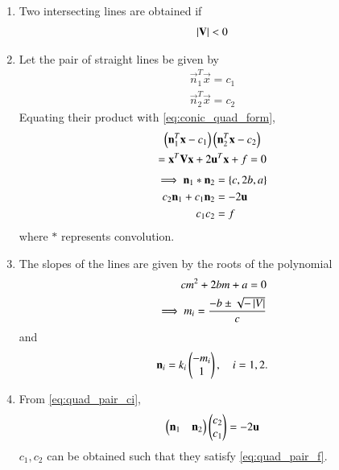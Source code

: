 \renewcommand{\theequation}{\theenumi}
\begin{enumerate}[label=\thesection.\arabic*.,ref=\thesection.\theenumi]

\item Two intersecting lines are obtained if 
\begin{align}
\label{eq:quad_pair_det}
\left\vert\mathbf{V}\right\vert < 0
\end{align}

\item Let the pair of straight lines be given by 
\begin{align}
\label{eq:quad_pair_lines}
\vec{n}_1^T \vec{x} = c_1
\\
\vec{n}_2^T \vec{x} = c_2
\end{align}
Equating their product with \eqref{eq:conic_quad_form},
\begin{multline}
\left(\mathbf{n}_1^T \mathbf{x} - c_1\right)
\left(\mathbf{n}_2^T \mathbf{x} - c_2\right) 
\\
=
\mathbf{x}^T\mathbf{V}\mathbf{x}+2\mathbf{u}^T\mathbf{x}+f=0
\end{multline}
\begin{align}
\implies 
\mathbf{n}_1 *\mathbf{n}_2  &= \left\{c,2b,a\right\}
\label{eq:quad_pair_conv}
\\
c_2\mathbf{n}_1 + c_1 \mathbf{n}_2 &= -2\mathbf{u}
\label{eq:quad_pair_ci}
\\
c_1 c_2 &= f
\label{eq:quad_pair_f}
\end{align}
%
where $*$ represents convolution.
\item The slopes of the lines are given by the roots of the polynomial
\begin{align}
\label{eq:quad_pair_slopes}
cm^2 + 2bm + a = 0
\\
\implies m_i = \frac{-b \pm \sqrt{-\left\vert V\right\vert}}{c}
\end{align}
and 
\begin{align}
\mathbf{n}_i = k_i\begin{pmatrix}-m_i\\1\end{pmatrix}, \quad i = 1,2.
\end{align}
\item From \eqref{eq:quad_pair_ci},
\begin{align}
\label{eq:quad_pair_ci_mat}
\begin{pmatrix}\mathbf{n}_1 & \mathbf{n}_2\end{pmatrix}\begin{pmatrix}c_2\\c_1\end{pmatrix} = -2\mathbf{u}
\end{align}
$c_1,c_2$ can be obtained such that they satisfy \eqref{eq:quad_pair_f}.


\end{enumerate}

